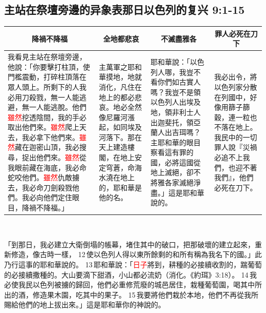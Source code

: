\subsection{主站在祭壇旁邊的异象表那日以色列的复兴 9:1-15}
\begin{table}[H]
\centering
\begin{tabular}{p{6.8cm}|p{3.2500cm}|p{4.00cm}|p{2.7500cm}}\hline\hline
\multicolumn{1}{c|}{降禍不降福}&\multicolumn{1}{c|}{全地都悲哀}&\multicolumn{1}{c|}{不滅盡雅各}&\multicolumn{1}{c}{罪人必死在刀下}\\\hline
我看見主站在祭壇旁邊，他說：「你要擊打柱頂，使門檻震動，打碎柱頂落在眾人頭上。所剩下的人我必用刀殺戮，無一人能逃避，無一人能逃脫。他們\textcolor{red}{雖然}挖透陰間，我的手必取出他們來。\textcolor{red}{雖然}爬上天去，我必拿下他們來。\textcolor{red}{雖然}藏在迦密山頂，我必搜尋，捉出他們來。\textcolor{red}{雖然}從我眼前藏在海底，我必命蛇咬他們。\textcolor{red}{雖然}仇敵擄去，我必命刀劍殺戮他們。我必向他們定住眼目，降禍不降福。」
&主萬軍之耶和華摸地，地就消化，凡住在地上的都必悲哀。地必全然像尼羅河漲起，如同埃及河落下。那在天上建造樓閣，在地上安定穹蒼，命海水澆在地上的，耶和華是他的名。
&耶和華說：「以色列人哪，我豈不看你們如古實人嗎？我豈不是領以色列人出埃及地，領非利士人出迦斐托，領亞蘭人出吉珥嗎？主耶和華的眼目察看這有罪的國，必將這國從地上滅絕，卻不將雅各家滅絕淨盡。」這是耶和華說的。
&我必出令，將以色列家分散在列國中，好像用篩子篩穀，連一粒也不落在地上。我民中的一切罪人說『災禍必追不上我們，也迎不著我們』，他們必死在刀下。\\\hline
\end{tabular}
\end{table} 


「到那日，我必建立大衛倒塌的帳幕，堵住其中的破口，把那破壞的建立起來，重新修造，像古時一樣， 12 使以色列人得以東所餘剩的和所有稱為我名下的國。」此乃行這事的耶和華說的。 13 耶和華說：「\textcolor{red}{日子}將到，耕種的必接續收割的，踹葡萄的必接續撒種的。大山要滴下甜酒，小山都必流奶（消化。《約珥》3:18）。 14 我必使我民以色列被擄的歸回，他們必重修荒廢的城邑居住，栽種葡萄園，喝其中所出的酒，修造果木園，吃其中的果子。 15 我要將他們栽於本地，他們不再從我所賜給他們的地上拔出來。」這是耶和華你的神說的。








